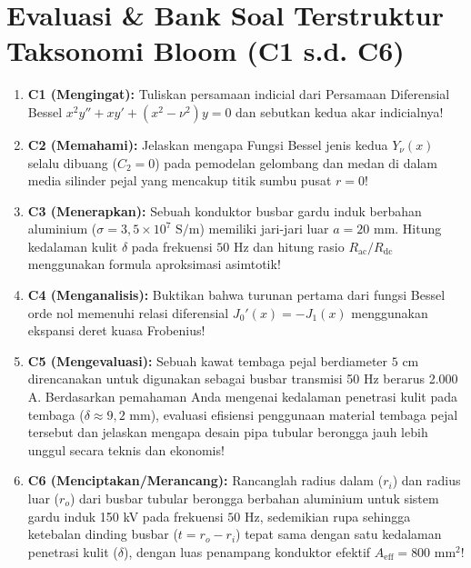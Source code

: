 \documentclass[11pt,a4paper]{article}
\theoremstyle{definition}
\begin{document}
\section{Evaluasi \& Bank Soal Terstruktur Taksonomi Bloom (C1 s.d. C6)}

\begin{enumerate}[leftmargin=*]
    \item \textbf{C1 (Mengingat):} 
    Tuliskan persamaan indicial dari Persamaan Diferensial Bessel $x^2 y'' + x y' + (x^2 - \nu^2)y = 0$ dan sebutkan kedua akar indicialnya!
    
    \item \textbf{C2 (Memahami):} 
    Jelaskan mengapa Fungsi Bessel jenis kedua $Y_\nu(x)$ selalu dibuang ($C_2 = 0$) pada pemodelan gelombang dan medan di dalam media silinder pejal yang mencakup titik sumbu pusat $r = 0$!
    
    \item \textbf{C3 (Menerapkan):} 
    Sebuah konduktor busbar gardu induk berbahan aluminium ($\sigma = 3{,}5 \times 10^7\text{ S/m}$) memiliki jari-jari luar $a = 20\text{ mm}$. Hitung kedalaman kulit $\delta$ pada frekuensi $50\text{ Hz}$ dan hitung rasio $R_{\text{ac}}/R_{\text{dc}}$ menggunakan formula aproksimasi asimtotik!
    
    \item \textbf{C4 (Menganalisis):} 
    Buktikan bahwa turunan pertama dari fungsi Bessel orde nol memenuhi relasi diferensial $J_0'(x) = -J_1(x)$ menggunakan ekspansi deret kuasa Frobenius!
    
    \item \textbf{C5 (Mengevaluasi):} 
    Sebuah kawat tembaga pejal berdiameter $5\text{ cm}$ direncanakan untuk digunakan sebagai busbar transmisi 50 Hz berarus 2.000 A. Berdasarkan pemahaman Anda mengenai kedalaman penetrasi kulit pada tembaga ($\delta \approx 9{,}2\text{ mm}$), evaluasi efisiensi penggunaan material tembaga pejal tersebut dan jelaskan mengapa desain pipa tubular berongga jauh lebih unggul secara teknis dan ekonomis!
    
    \item \textbf{C6 (Menciptakan/Merancang):} 
    Rancanglah radius dalam ($r_i$) dan radius luar ($r_o$) dari busbar tubular berongga berbahan aluminium untuk sistem gardu induk 150 kV pada frekuensi $50\text{ Hz}$, sedemikian rupa sehingga ketebalan dinding busbar ($t = r_o - r_i$) tepat sama dengan satu kedalaman penetrasi kulit ($\delta$), dengan luas penampang konduktor efektif $A_{\text{eff}} = 800\text{ mm}^2$!
\end{enumerate}
\end{document}
